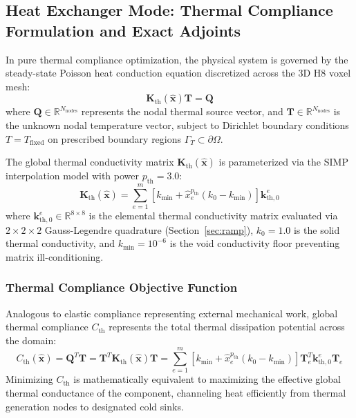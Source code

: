 \documentclass[11pt, a4paper]{article}
\begin{document}
\subsection{Heat Exchanger Mode: Thermal Compliance Formulation and Exact Adjoints}
\label{sec:heat_exchanger}
In pure thermal compliance optimization, the physical system is governed by the steady-state Poisson heat conduction equation discretized across the 3D H8 voxel mesh:
\begin{equation}
\mathbf{K}_{\text{th}}(\hat{\mathbf{x}}) \mathbf{T} = \mathbf{Q}
\end{equation}
where $\mathbf{Q} \in \mathbb{R}^{N_{\text{nodes}}}$ represents the nodal thermal source vector, and $\mathbf{T} \in \mathbb{R}^{N_{\text{nodes}}}$ is the unknown nodal temperature vector, subject to Dirichlet boundary conditions $T = T_{\text{fixed}}$ on prescribed boundary regions $\Gamma_T \subset \partial\Omega$.

The global thermal conductivity matrix $\mathbf{K}_{\text{th}}(\hat{\mathbf{x}})$ is parameterized via the SIMP interpolation model with power $p_{\text{th}} = 3.0$:
\begin{equation}
\mathbf{K}_{\text{th}}(\hat{\mathbf{x}}) = \sum_{e=1}^m \left[ k_{\min} + \hat{x}_e^{p_{\text{th}}} (k_0 - k_{\min}) \right] \mathbf{k}_{\text{th}, 0}^e
\end{equation}
where $\mathbf{k}_{\text{th}, 0}^e \in \mathbb{R}^{8 \times 8}$ is the elemental thermal conductivity matrix evaluated via $2 \times 2 \times 2$ Gauss-Legendre quadrature (Section~\ref{sec:ramp}), $k_0 = 1.0$ is the solid thermal conductivity, and $k_{\min} = 10^{-6}$ is the void conductivity floor preventing matrix ill-conditioning.

\subsubsection{Thermal Compliance Objective Function}
Analogous to elastic compliance representing external mechanical work, global thermal compliance $C_{\text{th}}$ represents the total thermal dissipation potential across the domain:
\begin{equation}
C_{\text{th}}(\hat{\mathbf{x}}) = \mathbf{Q}^T \mathbf{T} = \mathbf{T}^T \mathbf{K}_{\text{th}}(\hat{\mathbf{x}}) \mathbf{T} = \sum_{e=1}^m \left[ k_{\min} + \hat{x}_e^{p_{\text{th}}} (k_0 - k_{\min}) \right] \mathbf{T}_e^T \mathbf{k}_{\text{th}, 0}^e \mathbf{T}_e
\end{equation}
Minimizing $C_{\text{th}}$ is mathematically equivalent to maximizing the effective global thermal conductance of the component, channeling heat efficiently from thermal generation nodes to designated cold sinks.
\end{document}
